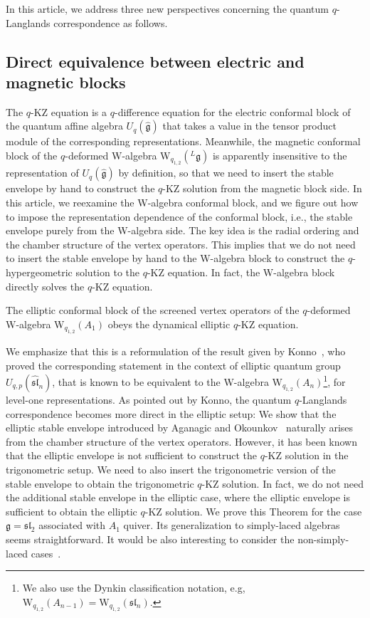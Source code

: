In this article, we address three new perspectives concerning the quantum $q$-Langlands correspondence as follows.
\subsection{Direct equivalence between electric and magnetic blocks}
The $q$-KZ equation is a $q$-difference equation for the electric conformal block of the quantum affine algebra $U_q(\widehat{\mathfrak{g}})$ that takes a value in the tensor product module of the corresponding representations.
Meanwhile, the magnetic conformal block of the $q$-deformed W-algebra W$_{q_{1,2}}(^L\mathfrak{g})$ is apparently insensitive to the representation of $U_q(\widehat{\mathfrak{g}})$ by definition, so that we need to insert the stable envelope by hand to construct the $q$-KZ solution from the magnetic block side.
In this article, we reexamine the W-algebra conformal block, and we figure out how to impose the representation dependence of the conformal block, i.e., the stable envelope purely from the W-algebra side. 
The key idea is the radial ordering and the chamber structure of the vertex operators.
This implies that we do not need to insert the stable envelope by hand to the W-algebra block to construct the $q$-hypergeometric solution to the $q$-KZ equation.
In fact, the W-algebra block directly solves the $q$-KZ equation.
\begin{theorem}
    The elliptic conformal block of the screened vertex operators of the $q$-deformed W-algebra W$_{q_{1,2}}(A_1)$ obeys the dynamical elliptic $q$-KZ equation.
\end{theorem}
We emphasize that this is a reformulation of the result given by Konno~\cite{Konno:2017mos,Konno:2018JIS,Konno2020}, who proved the corresponding statement in the context of elliptic quantum group $U_{q,p}(\widehat{\mathfrak{sl}}_n)$, that is known to be equivalent to the W-algebra W$_{q_{1,2}}(A_n)$\footnote{We also use the Dynkin classification notation, e.g, $\mathrm{W}_{q_{1,2}}(A_{n-1}) = \mathrm{W}_{q_{1,2}}(\mathfrak{sl}_n)$. }, for level-one representations.
As pointed out by Konno, the quantum $q$-Langlands correspondence becomes more direct in the elliptic setup:
We show that the elliptic stable envelope introduced by Aganagic and Okounkov~\cite{Aganagic:2016jmx} naturally arises from the chamber structure of the vertex operators.
However, it has been known that the elliptic envelope is not sufficient to construct the $q$-KZ solution in the trigonometric setup.
We need to also insert the trigonometric version of the stable envelope to obtain the trigonometric $q$-KZ solution.
In fact, we do not need the additional stable envelope in the elliptic case, where the elliptic envelope is sufficient to obtain the elliptic $q$-KZ solution.
We prove this Theorem for the case $\mathfrak{g} = \mathfrak{sl}_2$ associated with $A_1$ quiver.
Its generalization to simply-laced algebras seems straightforward. 
It would be also interesting to consider the non-simply-laced cases~\cite{Frenkel:1997lee,Kimura:2017hez,KPfractional}.


